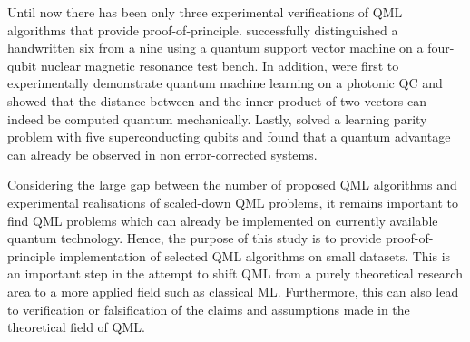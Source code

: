 \documentclass[a4paper]{article}
\newcommand*{\0}{$\ket{0}$}
\newcommand*{\1}{$\ket{1}$}
\begin{document}
Until now there has been only three experimental verifications of QML algorithms that provide proof-of-principle. \cite{Li2015} successfully distinguished a handwritten six from a nine using a quantum support vector machine on a four-qubit nuclear magnetic resonance test bench. In addition, \cite{Cai2015} were first to experimentally demonstrate quantum machine learning on a photonic QC and showed that the distance between and the inner product of two vectors can indeed be computed quantum mechanically. Lastly, \cite{Riste2015} solved a learning parity problem with five superconducting qubits and found that a quantum advantage can already be observed in non error-corrected systems.

Considering the large gap between the number of proposed QML algorithms and experimental realisations of scaled-down QML problems, it remains important to find QML problems which can already be implemented on currently available quantum technology. Hence, the purpose of this study is to provide proof-of-principle implementation of selected QML algorithms on small datasets. This is an important step in the attempt to shift QML from a purely theoretical research area to a more applied field such as classical ML. Furthermore, this can also lead to verification or falsification of the claims and assumptions made in the theoretical field of QML. 


\end{document}

